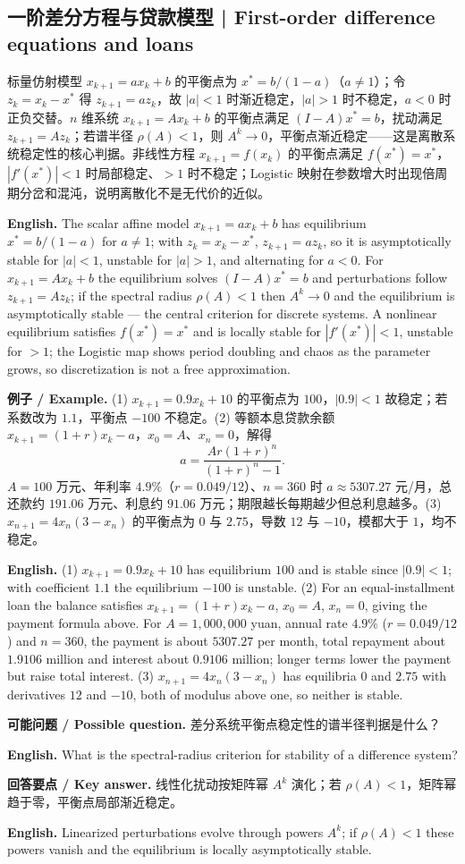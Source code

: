 \documentclass[UTF8,11pt,a4paper]{ctexart}
\newcommand{\EN}[1]{\par\noindent\textbf{English.} #1\par}
\newcommand{\EX}[2]{\par\noindent\textbf{例子 / Example.} #1\par\EN{#2}}
\newcommand{\ASK}[4]{\par\noindent\textbf{可能问题 / Possible question.} #1\par\EN{#2}\noindent\textbf{回答要点 / Key answer.} #3\par\EN{#4}\smallskip}
\begin{document}
\subsection{一阶差分方程与贷款模型 | First-order difference equations and loans}
标量仿射模型 $x_{k+1}=ax_k+b$ 的平衡点为 $x^*=b/(1-a)$（$a\ne1$）；令 $z_k=x_k-x^*$ 得 $z_{k+1}=az_k$，故 $|a|<1$ 时渐近稳定，$|a|>1$ 时不稳定，$a<0$ 时正负交替。$n$ 维系统 $x_{k+1}=Ax_k+b$ 的平衡点满足 $(I-A)x^*=b$，扰动满足 $z_{k+1}=Az_k$；若谱半径 $\rho(A)<1$，则 $A^k\to0$，平衡点渐近稳定——这是离散系统稳定性的核心判据。非线性方程 $x_{k+1}=f(x_k)$ 的平衡点满足 $f(x^*)=x^*$，$|f'(x^*)|<1$ 时局部稳定、$>1$ 时不稳定；Logistic 映射在参数增大时出现倍周期分岔和混沌，说明离散化不是无代价的近似。
\EN{The scalar affine model $x_{k+1}=ax_k+b$ has equilibrium $x^*=b/(1-a)$ for $a\ne1$; with $z_k=x_k-x^*$, $z_{k+1}=az_k$, so it is asymptotically stable for $|a|<1$, unstable for $|a|>1$, and alternating for $a<0$. For $x_{k+1}=Ax_k+b$ the equilibrium solves $(I-A)x^*=b$ and perturbations follow $z_{k+1}=Az_k$; if the spectral radius $\rho(A)<1$ then $A^k\to0$ and the equilibrium is asymptotically stable — the central criterion for discrete systems. A nonlinear equilibrium satisfies $f(x^*)=x^*$ and is locally stable for $|f'(x^*)|<1$, unstable for $>1$; the Logistic map shows period doubling and chaos as the parameter grows, so discretization is not a free approximation.}
\EX{(1) $x_{k+1}=0.9x_k+10$ 的平衡点为 $100$，$|0.9|<1$ 故稳定；若系数改为 $1.1$，平衡点 $-100$ 不稳定。(2) 等额本息贷款余额 $x_{k+1}=(1+r)x_k-a$，$x_0=A$、$x_n=0$，解得
\[
a=\frac{Ar(1+r)^n}{(1+r)^n-1}.
\]
$A=100$ 万元、年利率 $4.9\%$（$r=0.049/12$）、$n=360$ 时 $a\approx5307.27$ 元/月，总还款约 $191.06$ 万元、利息约 $91.06$ 万元；期限越长每期越少但总利息越多。(3) $x_{n+1}=4x_n(3-x_n)$ 的平衡点为 $0$ 与 $2.75$，导数 $12$ 与 $-10$，模都大于 $1$，均不稳定。}{(1) $x_{k+1}=0.9x_k+10$ has equilibrium $100$ and is stable since $|0.9|<1$; with coefficient $1.1$ the equilibrium $-100$ is unstable. (2) For an equal-installment loan the balance satisfies $x_{k+1}=(1+r)x_k-a$, $x_0=A$, $x_n=0$, giving the payment formula above. For $A=1{,}000{,}000$ yuan, annual rate $4.9\%$ ($r=0.049/12$) and $n=360$, the payment is about $5307.27$ per month, total repayment about $1.9106$ million and interest about $0.9106$ million; longer terms lower the payment but raise total interest. (3) $x_{n+1}=4x_n(3-x_n)$ has equilibria $0$ and $2.75$ with derivatives $12$ and $-10$, both of modulus above one, so neither is stable.}
\ASK{差分系统平衡点稳定性的谱半径判据是什么？}{What is the spectral-radius criterion for stability of a difference system?}{线性化扰动按矩阵幂 $A^k$ 演化；若 $\rho(A)<1$，矩阵幂趋于零，平衡点局部渐近稳定。}{Linearized perturbations evolve through powers $A^k$; if $\rho(A)<1$ these powers vanish and the equilibrium is locally asymptotically stable.}
\end{document}
